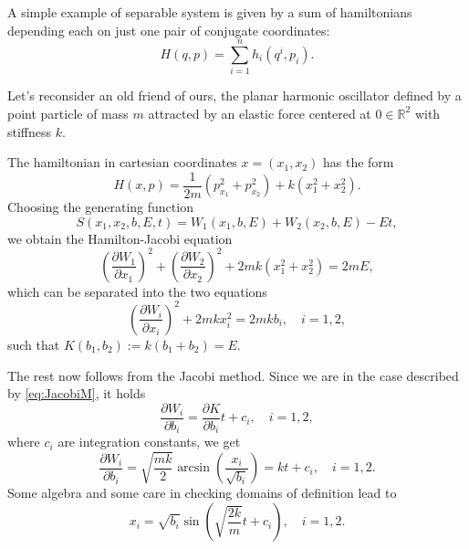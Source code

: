 \documentclass[english,fontsize=11pt,paper=a5,oneside]{scrbook}
\newcommand{\R}{\mathbb{R}}
\theoremstyle{definition}
\newenvironment{example}
  {\pushQED{\qed}\renewcommand{\qedsymbol}{$\lozenge$}\examplex}
  {\popQED\endexamplex}
\begin{document}
\begin{example}
    A simple example of separable system is given by a sum of hamiltonians depending each on just one pair of conjugate coordinates:
    \begin{equation}
        H(q,p) = \sum_{i=1}^n h_i(q^i, p_i).
    \end{equation}
\end{example}

\begin{example}[Planar harmonic oscillator]\label{ex:integrabilitypho}
    Let's reconsider an old friend of ours, the planar harmonic oscillator defined by a point particle of mass $m$ attracted by an elastic force centered at $0\in\R^2$ with stiffness $k$.
    
    The hamiltonian in cartesian coordinates $x=(x_1, x_2)$ has the form
    \begin{equation}
        H(x,p) = \frac{1}{2m}(p_{x_1}^2 + p_{x_2}^2) + k(x_1^2 + x_2^2).
    \end{equation}
    Choosing the generating function
    \begin{equation}
        S(x_1, x_2, b, E, t) = W_1(x_1, b, E) + W_2(x_2, b, E) - E t,
    \end{equation}
    we obtain the Hamilton-Jacobi equation
    \begin{equation}
        \left(\frac{\partial W_1}{\partial x_1}\right)^2
        + \left(\frac{\partial W_2}{\partial x_2}\right)^2
        + 2m k (x_1^2 + x_2^2) = 2m E,
    \end{equation}
    which can be separated into the two equations
    \begin{equation}
        \left(\frac{\partial W_i}{\partial x_i}\right)^2
        + 2m k x_i^2  = 2m k b_i, \quad i=1,2,
    \end{equation}
    such that $K(b_1,b_2) := k(b_1 + b_2) = E$.

    The rest now follows from the Jacobi method.
    Since we are in the case described by \eqref{eq:JacobiM}, it holds
    \begin{equation}
        \frac{\partial W_i}{\partial b_i} = \frac{\partial K}{\partial b_i}t + c_i, \quad i=1,2,
    \end{equation}
    where $c_i$ are integration constants, we get
    \begin{equation}
        \frac{\partial W_i}{\partial b_i} = \sqrt{\frac{mk}{2}}\arcsin\left(\frac{x_i}{\sqrt{b_i}}\right) = kt + c_i, \quad i=1,2.
    \end{equation}
    Some algebra and some care in checking domains of definition lead to
    \begin{equation}
        x_i = \sqrt{b_i} \sin\left(\sqrt{\frac{2k}{m}} t + c_i\right), \quad i=1,2.
    \end{equation}


\end{example}
\end{document}
